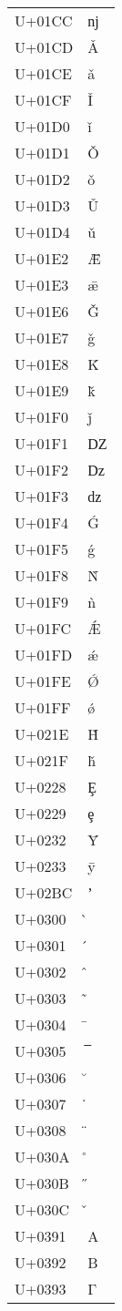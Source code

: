 \documentclass{article}
\begin{document}
\begin{longtable}{ll}
U+01CC & ǌ \\
U+01CD & Ǎ \\
U+01CE & ǎ \\
U+01CF & Ǐ \\
U+01D0 & ǐ \\
U+01D1 & Ǒ \\
U+01D2 & ǒ \\
U+01D3 & Ǔ \\
U+01D4 & ǔ \\
U+01E2 & Ǣ \\
U+01E3 & ǣ \\
U+01E6 & Ǧ \\
U+01E7 & ǧ \\
U+01E8 & Ǩ \\
U+01E9 & ǩ \\
U+01F0 & ǰ \\
U+01F1 & Ǳ \\
U+01F2 & ǲ \\
U+01F3 & ǳ \\
U+01F4 & Ǵ \\
U+01F5 & ǵ \\
U+01F8 & Ǹ \\
U+01F9 & ǹ \\
U+01FC & Ǽ \\
U+01FD & ǽ \\
U+01FE & Ǿ \\
U+01FF & ǿ \\
U+021E & Ȟ \\
U+021F & ȟ \\
U+0228 & Ȩ \\
U+0229 & ȩ \\
U+0232 & Ȳ \\
U+0233 & ȳ \\
U+02BC & ʼ \\
U+0300 & ̀ \\
U+0301 & ́ \\
U+0302 & ̂ \\
U+0303 & ̃ \\
U+0304 & ̄ \\
U+0305 & ̅ \\
U+0306 & ̆ \\
U+0307 & ̇ \\
U+0308 & ̈ \\
U+030A & ̊ \\
U+030B & ̋ \\
U+030C & ̌ \\
U+0391 & Α \\
U+0392 & Β \\
U+0393 & Γ \\

\end{longtable}
\end{document}
